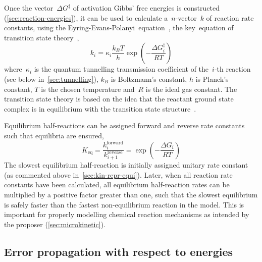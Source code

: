 Once the vector~$\Delta G^\ddagger$ of activation Gibbs' free energies is constructed (\cref{sec:reaction-energies}),
it can be used to calculate a~$n$-vector~$k$ of reaction rate constants,
using the Eyring-Evans-Polanyi~equation~\cite{Eyring_1935,Evans_1935,TransitionStateTheory},
the key~equation of transition state theory~\cite{TransitionStateTheory},
%
\begin{equation}\label{eq:rate-consts}
	k_i = \kappa_i \frac{k_B T}{h}
	\exp \left(-\frac{\Delta G_i^\ddagger}{R T} \right)
\end{equation}
%
where~$\kappa_i$ is the quantum tunnelling transmission coefficient of the~$i$-th reaction (see below in~\cref{sec:tunnelling}),
$k_B$ is Boltzmann's constant,
$h$ is Planck's constant,
$T$ is the chosen temperature and~$R$ is the ideal gas constant.
The transition state theory is based on the idea that the reactant ground state complex is in equilibrium with the transition state structure~\cite{TransitionStateTheory}.

Equilibrium half-reactions can be assigned forward and reverse rate constants such that equilibria are ensured,
%
\begin{equation}
	K_\text{eq}
	= \frac{k_i^\text{forward}}{k_{i + 1}^\text{reverse}}
	= \exp \left(-\frac{\Delta G_i}{R T} \right)
\end{equation}
%
The slowest equilibrium half-reaction is initially assigned unitary rate constant (as commented above in~\cref{sec:kin-repr-equi}).
Later,
when all reaction rate constants have been calculated,
all equilibrium half-reaction rates can be multiplied by a positive factor greater than one,
such that the slowest equilibrium is safely faster than the fastest non-equilibrium reaction in the model.
This is important for properly modelling chemical reaction mechanisms as intended by the proposer (\cref{sec:microkinetic}).

\subsection{Error propagation with respect to energies}%
\label{sec:rates-error-prop}

